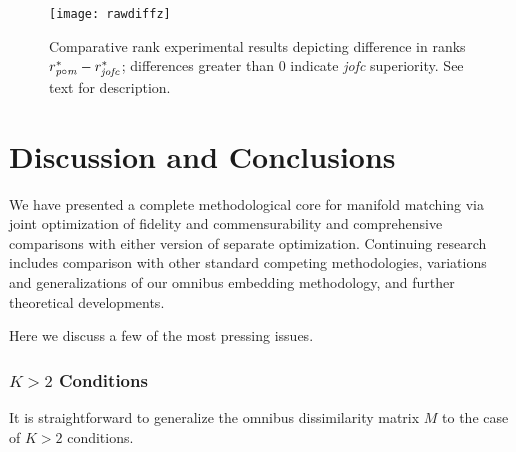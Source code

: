 \documentclass[12pt,xcolor]{article}
\newcommand{\1}{\ensuremath{\mbox{{\bf 1}}}}
\begin{document}
\begin{comment}
\begin{figure}[h]
\begin{center}
\texttt{[image: rawdiff]}
\caption{
Comparative reciprocal rank experimental results indicating {\em jofc} is superior to {\it p}$\circ${\it m}. See text for description.
}\label{fig:rawdiff}
\end{center}
\end{figure}
\end{comment}

\begin{figure}[h]
\begin{center}
\texttt{[image: rawdiffz]}
\caption{
Comparative rank experimental results
depicting difference in ranks
$r^*_{\protect{{\it p}\circ{\it m}}} - r^*_{\protect{\it jofc}}$;
differences greater than 0 indicate {\em jofc} superiority.
See text for description.
}\label{fig:rawdiffz}
\end{center}
\end{figure}

\section{Discussion and Conclusions}

We have presented a complete methodological core
for manifold matching via joint optimization of fidelity and commensurability
and comprehensive comparisons with either version of separate optimization.
Continuing research includes comparison with other standard competing methodologies,
variations and generalizations of our omnibus embedding methodology,
and further theoretical developments.

Here we discuss a few of the most pressing issues.

\subsubsection*{$K>2$ Conditions}

It is straightforward to generalize the omnibus dissimilarity matrix $M$ to the case of $K>2$ conditions.

\begin{comment}
djm:
It is straightforward ... conditions. There also exist generalized Procrustes
methods that could be used for the separate embedding methodology. Still, there
are many questions that arise in expanding to $K>2$: for example,
should all dissimilarities
be treated equally -- perhaps $W_{ij}=\lambda_{ij}\Delta_i+(1-\lambda_{ij})\Delta_j$
with not all $\lambda_{ij}=\frac{1}{2}$ should be considered (see below for more
on imputation of $W$). Also, there may be
merit in considering a tensor approach rather than a matrix. That is, instead of
filling the omnibus matrix with $W_{ij}$ matrices between pairs of dissimilarities,
a $K$ dimensional array might be utilized in some manner that allows for combinations
of more than two dissimilarities at once.
\end{comment}
\end{document}
